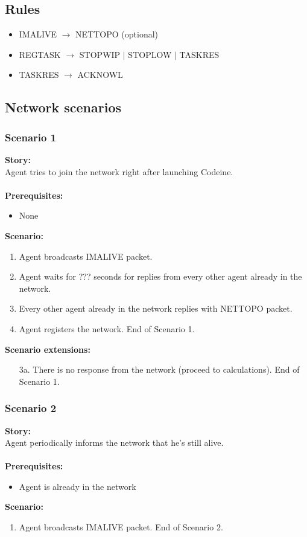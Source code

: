 \documentclass{article}
\begin{document}
\subsection{Rules}
\begin{itemize}
    \item IMALIVE $\rightarrow$ NETTOPO (optional)
    \item REGTASK $\rightarrow$ STOPWIP $\vert$ STOPLOW $\vert$ TASKRES
    \item TASKRES $\rightarrow$ ACKNOWL
\end{itemize}

\subsection{Network scenarios}
\subsubsection{Scenario 1}
\noindent\textbf{Story:} \\
Agent tries to join the network right after launching Codeine. \\\\
\textbf{Prerequisites:}
\begin{itemize}
    \item None
\end{itemize}
\textbf{Scenario:}
\begin{enumerate}
    \item Agent broadcasts IMALIVE packet.
    \item Agent waits for ??? seconds for replies from every other agent already in the network.
    \item Every other agent already in the network replies with NETTOPO packet.
    \item Agent registers the network. End of Scenario 1.
\end{enumerate}
\textbf{Scenario extensions:}
\begin{itemize}
    \item[3a.] There is no response from the network (proceed to calculations). End of Scenario 1.
\end{itemize}

\subsubsection{Scenario 2}
\noindent\textbf{Story:} \\
Agent periodically informs the network that he's still alive. \\\\
\textbf{Prerequisites:}
\begin{itemize}
    \item Agent is already in the network
\end{itemize}
\textbf{Scenario:}
\begin{enumerate}
    \item Agent broadcasts IMALIVE packet. End of Scenario 2.
\end{enumerate}
\end{document}
